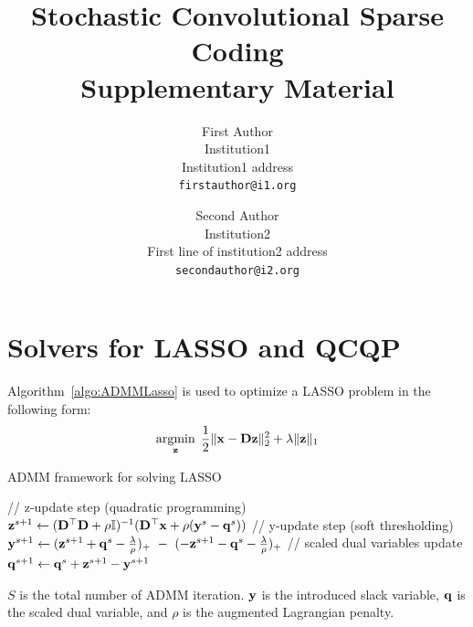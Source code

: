 \documentclass[10pt,twocolumn,letterpaper]{article}
\begin{document}
\title{Stochastic Convolutional Sparse Coding \\ Supplementary Material}

\author{First Author\\
Institution1\\
Institution1 address\\
{\tt\small firstauthor@i1.org}
\and
Second Author\\
Institution2\\
First line of institution2 address\\
{\tt\small secondauthor@i2.org}
}

\maketitle

\section{Solvers for LASSO and QCQP}
Algorithm~\ref{algo:ADMMLasso} is used to optimize a LASSO problem in the following form:
\begin{equation}
    \minimize{\code} \frac{1}{2}\|\signal - \Filter \code \|_2^2 + \lambda\| \code \|_1
\end{equation}

\begin{algorithm}
\caption{ADMM framework for solving LASSO} \label{algo:ADMMLasso}
\begin{algorithmic}[1]
        \State // z-update step (quadratic programming)
        \State $\code^{s+1} \gets (\Filter ^ \top \Filter + \rho \Id )^{-1}(\Filter^\top \signal + \rho(\Vector{y}^s - \Vector{q}^s ) )$
        \State // y-update step (soft thresholding)
        \State $\Vector{y}^{s+1} \gets (\code^{s+1}+\Vector{q}^{s} - \frac{\lambda}{\rho})_{+} ~ - ~ (-\code^{s+1}-\Vector{q}^{s} - \frac{\lambda}{\rho})_{+}$
        \State // scaled dual variables update
        \State $\Vector{q}^{s+1} \gets \bold{q}^{s}+\code^{s+1}-\Vector{y}^{s+1}$
    \EndFor
\end{algorithmic}
\end{algorithm}
$S$ is the total number of ADMM iteration. $\Vector{y}$ is the introduced slack variable, $\Vector{q}$ is the scaled dual variable, and $\rho$ is the augmented Lagrangian penalty.
\end{document}
